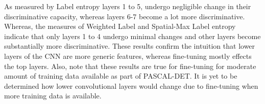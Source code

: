 As measured by Label entropy layers 1 to 5, undergo negligible change in their discriminative capacity, whereas layers 6-7 become a lot more discriminative. Whereas, the measures of Weighted Label and Spatial-Max Label entropy indicate that only layers 1 to 4 undergo minimal changes and other layers become substantially more discriminative. These results confirm the intuition that lower layers of the CNN are more generic features, whereas fine-tuning mostly effects the top layers. Also, note that these results are true for fine-tuning for moderate amount of training data available as part of PASCAL-DET. It is yet to be determined how lower convolutional layers would change due to fine-tuning when more training data is available. 